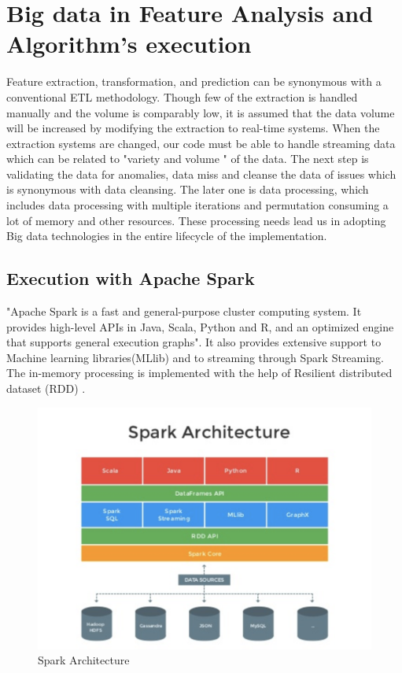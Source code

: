 \documentclass[sigconf]{acmart}
\begin{document}
\section{Big data in Feature Analysis and Algorithm's execution}
Feature extraction, transformation, and prediction can be synonymous with a conventional ETL methodology. Though few of the extraction is handled manually and the volume is comparably low, it is assumed that the data volume will be increased by modifying the extraction to real-time systems. When the extraction systems are changed, our code must be able to handle streaming data which can be related to "variety and volume " of the data. The next step is validating the data for anomalies, data miss and cleanse the data of issues which is synonymous with data cleansing. The later one is data processing, which includes data processing with multiple iterations and permutation consuming a lot of memory and other resources. These processing needs lead us in adopting Big data technologies in the entire lifecycle of the implementation.

\subsection{Execution with Apache Spark}
"Apache Spark is a fast and general-purpose cluster computing system. It provides high-level APIs in Java, Scala, Python and R, and an optimized engine that supports general execution graphs". It also provides extensive support to Machine learning libraries(MLlib) and to streaming through Spark Streaming. The in-memory processing is implemented with the help of Resilient distributed dataset (RDD) \cite{5:online}.

\begin{figure}[!ht]
  \centering\includegraphics[width=\columnwidth]{images/Sparkarchic.png}
  \caption{Spark Architecture}
\end{figure}
\end{document}
